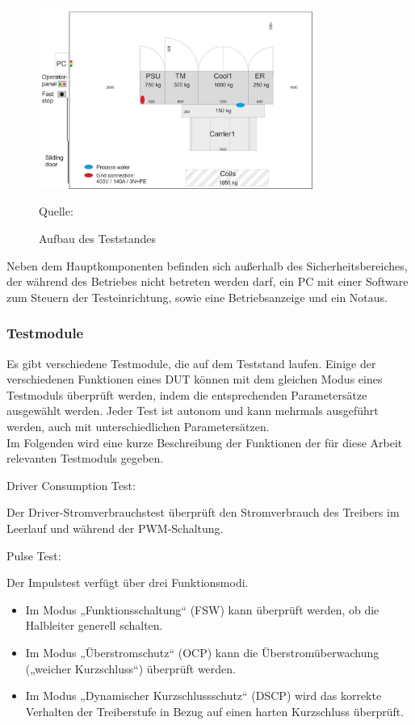 \begin{figure}[h]
    \centering
    \includegraphics[width=0.8\textwidth]{Grafiken/Test Cabin.jpg}
    \caption{Aufbau des Teststandes}
    \label{fig:1. Aufbau des Teststandes}
    {Quelle: \cite*[7]{Main_Manuel_USTB2018}}
\end{figure}


Neben dem Hauptkomponenten befinden sich außerhalb des Sicherheitsbereiches, der während des Betriebes nicht betreten werden darf,
ein PC mit einer Software zum Steuern der Testeinrichtung, sowie eine Betriebsanzeige und ein Notaus. \cite*{Main_Manuel_USTB2018}
\color{red}
\subsubsection{Testmodule}

Es gibt verschiedene Testmodule, die auf dem Teststand laufen.
Einige der verschiedenen Funktionen eines DUT können mit dem gleichen Modus eines Testmoduls überprüft werden, indem die entsprechenden Parametersätze ausgewählt werden.
Jeder Test ist autonom und kann mehrmals ausgeführt werden, auch mit unterschiedlichen Parametersätzen.
\\
Im Folgenden wird eine kurze Beschreibung der Funktionen der für diese Arbeit relevanten Testmoduls gegeben.

Driver Consumption Test:

Der Driver-Stromverbrauchstest überprüft den Stromverbrauch des Treibers im Leerlauf und während der PWM-Schaltung.

Pulse Test:

Der Impulstest verfügt über drei Funktionsmodi.
\begin{itemize}
    \item Im Modus „Funktionsschaltung“ (FSW) kann überprüft werden, ob die Halbleiter generell schalten.
    \item Im Modus „Überstromschutz“ (OCP) kann die Überstromüberwachung („weicher Kurzschluss“) überprüft werden.
    \item Im Modus „Dynamischer Kurzschlussschutz“ (DSCP) wird das korrekte Verhalten der Treiberstufe in Bezug auf einen harten Kurzschluss überprüft.
\end{itemize}

